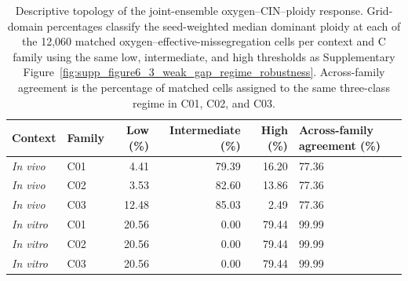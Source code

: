 \begin{table}[!htbp]
\centering
\scriptsize
\setlength{\tabcolsep}{4pt}
\caption{Descriptive topology of the joint-ensemble oxygen--CIN--ploidy response. Grid-domain percentages classify the seed-weighted median dominant ploidy at each of the 12,060 matched oxygen--effective-missegregation cells per context and C family using the same low, intermediate, and high thresholds as Supplementary Figure~\ref{fig:supp_figure6_3_weak_gap_regime_robustness}. Across-family agreement is the percentage of matched cells assigned to the same three-class regime in C01, C02, and C03.}
\label{tab:figure6_topology_summary}
\begin{tabular}{@{}llrrrp{}@{}}
\toprule
Context & Family & Low (\%) & Intermediate (\%) & High (\%) & Across-family agreement (\%) \\
\midrule
\textit{In vivo} & C01 & 4.41 & 79.39 & 16.20 & 77.36 \\
\textit{In vivo} & C02 & 3.53 & 82.60 & 13.86 & 77.36 \\
\textit{In vivo} & C03 & 12.48 & 85.03 & 2.49 & 77.36 \\
\addlinespace
\textit{In vitro} & C01 & 20.56 & 0.00 & 79.44 & 99.99 \\
\textit{In vitro} & C02 & 20.56 & 0.00 & 79.44 & 99.99 \\
\textit{In vitro} & C03 & 20.56 & 0.00 & 79.44 & 99.99 \\
\bottomrule
\end{tabular}
\end{table}
